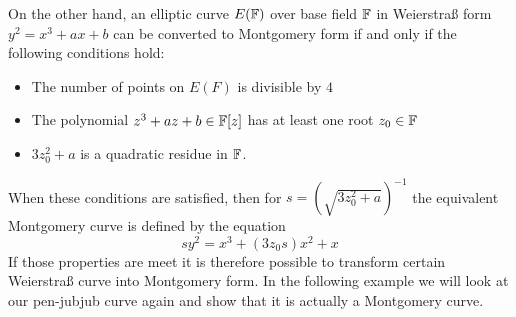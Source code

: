 On the other hand, an elliptic curve $E(\mathbb{F})$ over base field $\mathbb{F}$ in Weierstraß form $y^2 = x^3 + a x + b$ can be converted to Montgomery form if and only if the following conditions hold:
\begin{itemize}
\item The number of points on $E(F)$ is divisible by $4$
\item The polynomial $z^3 + a z + b \in \mathbb{F}[z]$ has at least one root $z_0\in\mathbb{F}$
\item $3z_0^2 + a$ is a quadratic residue in $\mathbb{F}$.
\end{itemize}
When these conditions are satisfied, then for $s=({\sqrt{3z_0^{2}+a}})^{-1}$ the equivalent Montgomery curve is defined by the equation
$$
sy^{2}=x^{3}+(3z_0 s)x^{2}+x
$$
If those properties are meet it is therefore possible to transform certain Weierstraß curve into Montgomery form. In the following example we will look at our pen-jubjub curve again and show that it is actually a Montgomery curve.
